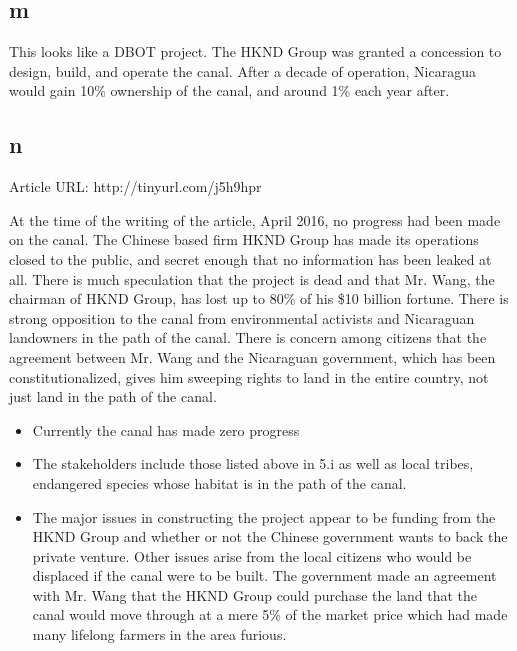 \documentclass[12pt]{article} %
\begin{document}
	\subsection{m}
		This looks like a DBOT project. The HKND Group was granted a concession to design, build, and operate the canal. After a decade of operation, Nicaragua would gain 10\% ownership of the canal, and around 1\% each year after.
		
	\subsection{n}
		Article URL: http://tinyurl.com/j5h9hpr
		\newline
		
		At the time of the writing of the article, April 2016, no progress had been made on the canal. The Chinese based firm HKND Group has made its operations closed to the public, and secret enough that no information has been leaked at all. There is much speculation that the project is dead and that Mr. Wang, the chairman of HKND Group, has lost up to 80\% of his \$10 billion fortune. There is strong opposition to the canal from environmental activists and Nicaraguan landowners in the path of the canal. There is concern among citizens that the agreement between Mr. Wang and the Nicaraguan government, which has been constitutionalized, gives him sweeping rights to land in the entire country, not just land in the path of the canal.
		
		\begin{itemize}
			\item Currently the canal has made zero progress
			\item The stakeholders include those listed above in 5.i as well as local tribes, endangered species whose habitat is in the path of the canal.
			\item The major issues in constructing the project appear to be funding from the HKND Group and whether or not the Chinese government wants to back the private venture. Other issues arise from the local citizens who would be displaced if the canal were to be built. The government made an agreement with Mr. Wang that the HKND Group could purchase the land that the canal would move through at a mere 5\% of the market price which had made many lifelong farmers in the area furious.
		\end{itemize}
\end{document}
